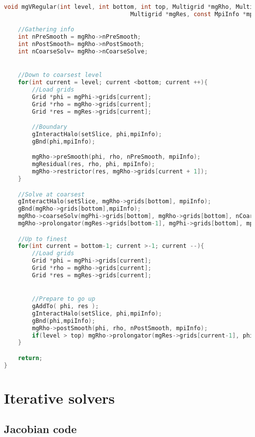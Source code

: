 \newpage
\begin{lstlisting}[language=c, caption = Implementation of an recursive V-cycle]
void mgVRegular(int level, int bottom, int top, Multigrid *mgRho, Multigrid *mgPhi,
 									Multigrid *mgRes, const MpiInfo *mpiInfo){

	//Gathering info
	int nPreSmooth = mgRho->nPreSmooth;
	int nPostSmooth= mgRho->nPostSmooth;
	int nCoarseSolv= mgRho->nCoarseSolve;


	//Down to coarsest level
	for(int current = level; current <bottom; current ++){
		//Load grids
		Grid *phi = mgPhi->grids[current];
		Grid *rho = mgRho->grids[current];
		Grid *res = mgRes->grids[current];

		//Boundary
		gInteractHalo(setSlice, phi,mpiInfo);
		gBnd(phi,mpiInfo);

		mgRho->preSmooth(phi, rho, nPreSmooth, mpiInfo);
		mgResidual(res, rho, phi, mpiInfo);
		mgRho->restrictor(res, mgRho->grids[current + 1]);
	}

	//Solve at coarsest
	gInteractHalo(setSlice, mgRho->grids[bottom], mpiInfo);
	gBnd(mgRho->grids[bottom],mpiInfo);
	mgRho->coarseSolv(mgPhi->grids[bottom], mgRho->grids[bottom], nCoarseSolv, mpiInfo);
	mgRho->prolongator(mgRes->grids[bottom-1], mgPhi->grids[bottom], mpiInfo);

	//Up to finest
	for(int current = bottom-1; current >-1; current --){
		//Load grids
		Grid *phi = mgPhi->grids[current];
		Grid *rho = mgRho->grids[current];
		Grid *res = mgRes->grids[current];


		//Prepare to go up
		gAddTo( phi, res );
		gInteractHalo(setSlice, phi,mpiInfo);
		gBnd(phi,mpiInfo);
		mgRho->postSmooth(phi, rho, nPostSmooth, mpiInfo);
		if(level > top)	mgRho->prolongator(mgRes->grids[current-1], phi, mpiInfo);
	}

	return;
}
\end{lstlisting}





\newpage
\section{Iterative solvers}
\subsection{Jacobian code}
\label{sec:jacobian}


